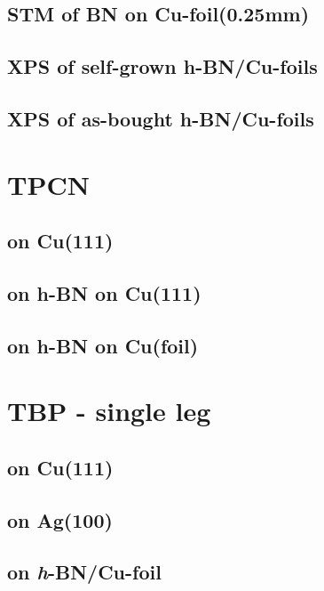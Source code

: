 \documentclass[10pt,a4paper,twoside
,BCOR=8mm				%
,headings=normal		%
,headsepline			%
,footsepline			%
,plainfootsepline		%
]{scrbook}
\begin{document}
  \section{STM of BN on Cu-foil(0.25mm)}
     
  \section{XPS of self-grown h-BN/Cu-foils}
     
  \section{XPS of as-bought h-BN/Cu-foils}
     
\chapter{TPCN}
    \section{on Cu(111)}
       
    \section{on h-BN on Cu(111)}
       
    \section{on h-BN on Cu(foil)}
       
\chapter{TBP - single leg}
   
   \section{on Cu(111)}
      
   \section{on Ag(100)}
      
   \section{on \textit{h}-BN/Cu-foil}
      
\end{document}
